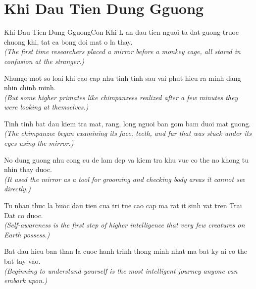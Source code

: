 \section{Khi Dau Tien Dung Gguong}
\begin{truyen}{Khi Dau Tien Dung Gguong}{Con Khi}
L an dau tien nguoi ta dat guong truoc chuong khi, tat ca bong doi mat o la thay.\\
\textit{(The first time researchers placed a mirror before a monkey cage, all stared in confusion at the stranger.)}

Nhungo mot so loai khi cao cap nhu tinh tinh sau vai phut hieu ra minh dang nhin chinh minh.\\
\textit{(But some higher primates like chimpanzees realized after a few minutes they were looking at themselves.)}

Tinh tinh bat dau kiem tra mat, rang, long nguoi ban gom bam duoi mat guong.\\
\textit{(The chimpanzee began examining its face, teeth, and fur that was stuck under its eyes using the mirror.)}

No dung guong nhu cong cu de lam dep va kiem tra khu vuc co the no khong tu nhin thay duoc.\\
\textit{(It used the mirror as a tool for grooming and checking body areas it cannot see directly.)}

Tu nhan thuc la buoc dau tien cua tri tue cao cap ma rat it sinh vat tren Trai Dat co duoc.\\
\textit{(Self-awareness is the first step of higher intelligence that very few creatures on Earth possess.)}

\end{truyen}
\begin{baihoc}
  Bat dau hieu ban than la cuoc hanh trinh thong minh nhat ma bat ky ai co the bat tay vao.\\
  \textit{(Beginning to understand yourself is the most intelligent journey anyone can embark upon.)}
\end{baihoc}

